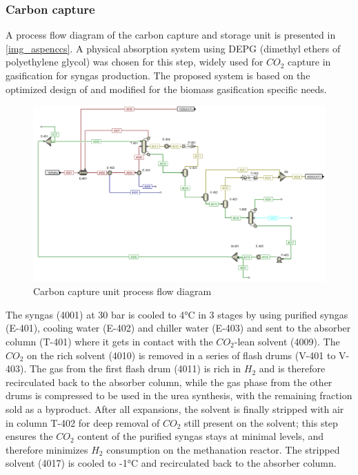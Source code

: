 \documentclass[a4paper, titlepage]{article}
\begin{document}
\subsubsection{Carbon capture}

A process flow diagram of the carbon capture and storage unit is presented in \autoref{img_aspenccs}.
A physical absorption system using DEPG (dimethyl ethers of polyethylene glycol) was chosen for this step, widely
used for $CO_2$ capture in gasification for syngas production. The proposed system is based on the optimized design
of \textcite{martelliMultiobjectiveOptimizationSelexol2015} and modified for the biomass gasification specific needs. 

\begin{figure}
	\includegraphics[width=\textwidth]{img/aspen_ccs.png}
	\caption{Carbon capture unit process flow diagram}
	\label{img_aspenccs}
\end{figure}

The syngas (4001) at 30 bar is cooled to 4°C in 3 stages by using purified syngas (E-401), cooling water (E-402) and
chiller water (E-403) and sent to the absorber column (T-401) where it gets in contact with the $CO_2$-lean 
solvent (4009). The $CO_2$ on the rich solvent (4010) is removed in a series of flash drums (V-401 to V-403). 
The gas from the first flash drum (4011) is rich in $H_2$ and is therefore recirculated back to the absorber column,
while the gas phase from the other drums is compressed to be used in the urea synthesis, with the remaining fraction sold as a byproduct. After all expansions, the solvent is finally stripped with air \cite{mokhatabNaturalGasSweetening2012} 
in column T-402 for deep removal of $CO_2$ still present on the solvent; this step ensures the $CO_2$ content of the 
purified syngas stays at minimal levels, and therefore minimizes $H_2$ consumption on the methanation reactor. 
The stripped solvent (4017) is cooled to -1°C and recirculated back to the absorber column.
\end{document}
